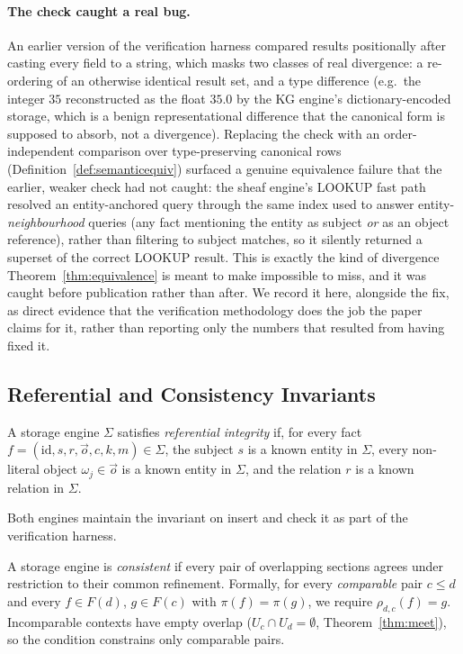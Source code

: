 \paragraph{The check caught a real bug.} An earlier version of the
verification harness compared results positionally after casting every
field to a string, which masks two classes of real divergence: a
re-ordering of an otherwise identical result set, and a type difference
(e.g.\ the integer $35$ reconstructed as the float $35.0$ by the KG
engine's dictionary-encoded storage, which is a benign representational
difference that the canonical form is supposed to absorb, not a
divergence). Replacing the check with an order-independent comparison over
type-preserving canonical rows (Definition~\ref{def:semanticequiv}) surfaced
a genuine equivalence failure that the earlier, weaker check had not
caught: the sheaf engine's LOOKUP fast path resolved an entity-anchored
query through the same index used to answer entity-\emph{neighbourhood}
queries (any fact mentioning the entity as subject \emph{or} as an object
reference), rather than filtering to subject matches, so it silently
returned a superset of the correct LOOKUP result. This is exactly the kind
of divergence Theorem~\ref{thm:equivalence} is meant to make impossible to
miss, and it was caught before publication rather than after. We record it
here, alongside the fix, as direct evidence that the verification
methodology does the job the paper claims for it, rather than reporting
only the numbers that resulted from having fixed it.

\subsection{Referential and Consistency Invariants}
\label{sec:correctness:integrity}

\begin{definition}
\label{def:refintegrity}
A storage engine $\Sigma$ satisfies \emph{referential integrity} if, for
every fact $f = (\mathrm{id}, s, r, \vec{o}, c, k, m) \in \Sigma$, the subject
$s$ is a known entity in $\Sigma$, every non-literal object $\omega_j \in \vec{o}$
is a known entity in $\Sigma$, and the relation $r$ is a known relation in
$\Sigma$.
\end{definition}

Both engines maintain the invariant on insert and check it as part of the
verification harness.

\begin{definition}[Consistency]
\label{def:consistency}
A storage engine is \emph{consistent} if every pair of overlapping sections
agrees under restriction to their common refinement. Formally, for every
\emph{comparable} pair $c \leq d$ and every $f \in F(d)$, $g \in F(c)$ with
$\pi(f) = \pi(g)$, we require $\rho_{d, c}(f) = g$. Incomparable contexts
have empty overlap ($U_c \cap U_d = \emptyset$, Theorem~\ref{thm:meet}),
so the condition constrains only comparable pairs.
\end{definition}

